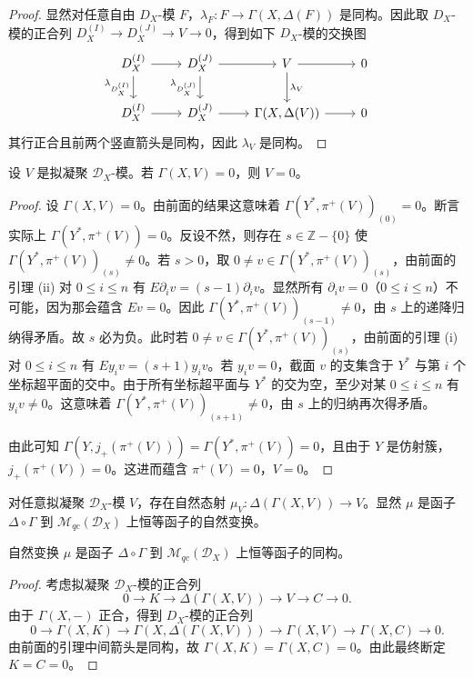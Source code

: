 \begin{proof}
显然对任意自由 $D_X$-模 $F$，$\lambda_F:F\to\Gamma(X,\Delta(F))$ 是同构。因此取 $D_X$-模的正合列 $D_X^{(I)}\to D_X^{(J)}\to V\to 0$，得到如下 $D_X$-模的交换图
$$\begin{tikzcd}
D_X^{(I)} \arrow[r] \arrow[d,"\lambda_{D_X^{(I)}}"'] & D_X^{(J)} \arrow[r] \arrow[d,"\lambda_{D_X^{(J)}}"'] & V \arrow[r] \arrow[d,"\lambda_V"] & 0\\
D_X^{(I)} \arrow[r] & D_X^{(J)} \arrow[r] & \Gamma(X,\Delta(V)) \arrow[r] & 0
\end{tikzcd}$$
其行正合且前两个竖直箭头是同构，因此 $\lambda_V$ 是同构。
\end{proof}

\begin{lemma}
设 $V$ 是拟凝聚 $\mathcal{D}_X$-模。若 $\Gamma(X,V)=0$，则 $V=0$。
\end{lemma}

\begin{proof}
设 $\Gamma(X,V)=0$。由前面的结果这意味着 $\Gamma(Y^*,\pi^+(V))_{(0)}=0$。断言实际上 $\Gamma(Y^*,\pi^+(V))=0$。反设不然，则存在 $s\in\mathbb{Z}-\{0\}$ 使 $\Gamma(Y^*,\pi^+(V))_{(s)}\neq 0$。若 $s>0$，取 $0\neq v\in\Gamma(Y^*,\pi^+(V))_{(s)}$，由前面的引理 (ii) 对 $0\le i\le n$ 有 $E\partial_iv=(s-1)\partial_iv$。显然所有 $\partial_iv=0$（$0\le i\le n$）不可能，因为那会蕴含 $Ev=0$。因此 $\Gamma(Y^*,\pi^+(V))_{(s-1)}\neq 0$，由 $s$ 上的递降归纳得矛盾。故 $s$ 必为负。此时若 $0\neq v\in\Gamma(Y^*,\pi^+(V))_{(s)}$，由前面的引理 (i) 对 $0\le i\le n$ 有 $Ey_iv=(s+1)y_iv$。若 $y_iv=0$，截面 $v$ 的支集含于 $Y^*$ 与第 $i$ 个坐标超平面的交中。由于所有坐标超平面与 $Y^*$ 的交为空，至少对某 $0\le i\le n$ 有 $y_iv\neq 0$。这意味着 $\Gamma(Y^*,\pi^+(V))_{(s+1)}\neq 0$，由 $s$ 上的归纳再次得矛盾。

由此可知 $\Gamma(Y,j_+(\pi^+(V)))=\Gamma(Y^*,\pi^+(V))=0$，且由于 $Y$ 是仿射簇，$j_+(\pi^+(V))=0$。这进而蕴含 $\pi^+(V)=0$，$V=0$。
\end{proof}

对任意拟凝聚 $\mathcal{D}_X$-模 $V$，存在自然态射 $\mu_V:\Delta(\Gamma(X,V))\to V$。显然 $\mu$ 是函子 $\Delta\circ\Gamma$ 到 $\mathcal{M}_{qc}(\mathcal{D}_X)$ 上恒等函子的自然变换。

\begin{lemma}
自然变换 $\mu$ 是函子 $\Delta\circ\Gamma$ 到 $\mathcal{M}_{qc}(\mathcal{D}_X)$ 上恒等函子的同构。
\end{lemma}

\begin{proof}
考虑拟凝聚 $\mathcal{D}_X$-模的正合列
$$0\longrightarrow K\longrightarrow\Delta(\Gamma(X,V))\longrightarrow V\longrightarrow C\longrightarrow 0.$$
由于 $\Gamma(X,-)$ 正合，得到 $D_X$-模的正合列
$$0\to\Gamma(X,K)\to\Gamma(X,\Delta(\Gamma(X,V)))\to\Gamma(X,V)\to\Gamma(X,C)\to 0.$$
由前面的引理中间箭头是同构，故 $\Gamma(X,K)=\Gamma(X,C)=0$。由此最终断定 $K=C=0$。
\end{proof}

